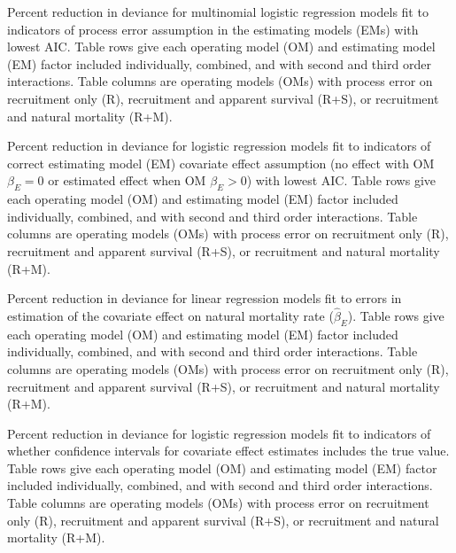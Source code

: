 \documentclass[
  12pt,
]{article}
\begin{document}
\begin{table}
\caption{Percent reduction in deviance for multinomial logistic regression models fit to indicators of process error assumption in the estimating models (EMs) with lowest AIC. Table rows give each operating model (OM) and estimating model (EM) factor included individually, combined, and with second and third order interactions. Table columns are operating models (OMs) with process error on recruitment only (R), recruitment and apparent survival (R+S), or recruitment and natural mortality (R+M).}\label{AIC_PE_PRD_table}
{}
\end{table}
\pagebreak

\begin{table}
\caption{Percent reduction in deviance for logistic regression models fit to indicators of correct estimating model (EM) covariate effect assumption (no effect with OM $\beta_E = 0$ or estimated effect when OM $\beta_E > 0$) with lowest AIC. Table rows give each operating model (OM) and estimating model (EM) factor included individually, combined, and with second and third order interactions. Table columns are operating models (OMs) with process error on recruitment only (R), recruitment and apparent survival (R+S), or recruitment and natural mortality (R+M).}\label{AIC_Ecov_effect_PRD_table}
{}
\end{table}
\pagebreak

\begin{table}
\caption{Percent reduction in deviance for linear regression models fit to errors in estimation of the covariate effect on natural mortality rate ($\widehat \beta_E$). Table rows give each operating model (OM) and estimating model (EM) factor included individually, combined, and with second and third order interactions. Table columns are operating models (OMs) with process error on recruitment only (R), recruitment and apparent survival (R+S), or recruitment and natural mortality (R+M).}\label{bias_ecov_beta_converged_PRD_table}
{}
\end{table}
\pagebreak

\begin{table}
\caption{Percent reduction in deviance for logistic regression models fit to indicators of whether confidence intervals for covariate effect estimates includes the true value. Table rows give each operating model (OM) and estimating model (EM) factor included individually, combined, and with second and third order interactions. Table columns are operating models (OMs) with process error on recruitment only (R), recruitment and apparent survival (R+S), or recruitment and natural mortality (R+M).}\label{ecov_beta_ci_coverage_PRD_table}
{}
\end{table}
\pagebreak
\end{document}

